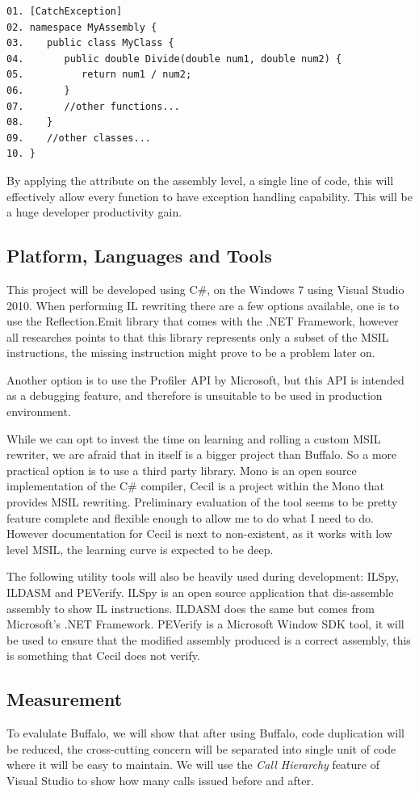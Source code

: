 \begin{verbatim}
01. [CatchException]
02. namespace MyAssembly {
03.    public class MyClass {
04.       public double Divide(double num1, double num2) {
05.          return num1 / num2;
06.       }
07.       //other functions...
08.    }
09.    //other classes...
10. }
\end{verbatim}

By applying the attribute on the assembly level, a single line of code, this will effectively allow every function to have exception handling capability. This will be a huge developer productivity gain.

\subsection{Platform, Languages and Tools}
This project will be developed using C\#, on the Windows 7 using Visual Studio 2010. When performing IL rewriting there are a few options available, one is to use the Reflection.Emit library that comes with the .NET Framework, however all researches points to that this library represents only a subset of the MSIL instructions, the missing instruction might prove to be a problem later on.

Another option is to use the Profiler API by Microsoft, but this API is intended as a debugging feature, and therefore is unsuitable to be used in production environment.

While we can opt to invest the time on learning and rolling a custom MSIL rewriter, we are afraid that in itself is a bigger project than Buffalo. So a more practical option is to use a third party library. Mono is an open source implementation of the C\# compiler, Cecil is a project within the Mono that provides MSIL rewriting. Preliminary evaluation of the tool seems to be pretty feature complete and flexible enough to allow me to do what I need to do. However documentation for Cecil is next to non-existent, as it works with low level MSIL, the learning curve is expected to be deep.

The following utility tools will also be heavily used during development: ILSpy, ILDASM and PEVerify. ILSpy is an open source application that dis-assemble assembly to show IL instructions. ILDASM does the same but comes from Microsoft’s .NET Framework. PEVerify is a Microsoft Window SDK tool, it will be used to ensure that the modified assembly produced is a correct assembly, this is something that Cecil does not verify.

\subsection{Measurement}
To evalulate Buffalo, we will show that after using Buffalo, code duplication will be reduced, the cross-cutting concern will be separated into single unit of code where it will be easy to maintain. We will use the {\em Call Hierarchy} feature of Visual Studio to show how many calls issued before and after. 

